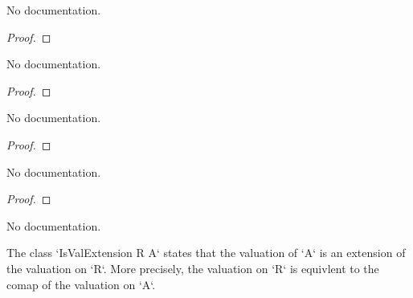 \begin{definition}
\begin{theorem}\label{IsValExtension.val_map_lt_iff}
        \leanok
                No documentation.
    \end{theorem}

\begin{proof}
    \leanok
\end{proof}

\begin{theorem}\label{IsValExtension.val_map_eq_iff}
        \leanok
                No documentation.
    \end{theorem}

\begin{proof}
    \leanok
\end{proof}

\begin{theorem}\label{IsValExtension.val_map_le_one_iff}
        \leanok
                No documentation.
    \end{theorem}

\begin{proof}
    \leanok
\end{proof}

\begin{theorem}\label{IsValExtension.val_map_lt_one_iff}
        \leanok
                No documentation.
    \end{theorem}

\begin{proof}
    \leanok
\end{proof}

\begin{theorem}\label{IsValExtension.val_map_eq_one_iff}
                No documentation.
    \end{theorem}

\begin{definition}\label{IsValExtension}
        \leanok
                The class `IsValExtension R A` states that the valuation of `A` is an extension of the valuation
on `R`. More precisely, the valuation on `R` is equivlent to the comap of the valuation on `A`.
    \end{definition}


\end{definition}
